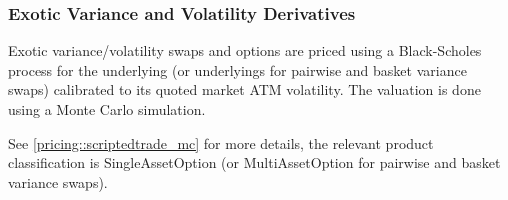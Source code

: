 \subsubsection{Exotic Variance and Volatility Derivatives}
\label{pricing::exotic_variance_swap}

Exotic variance/volatility swaps and options are priced using a Black-Scholes process for the underlying (or underlyings for pairwise
and basket variance swaps) calibrated to its quoted market ATM volatility. The valuation is done using a Monte Carlo simulation.

See \ref{pricing::scriptedtrade_mc} for more details, the relevant product classification is SingleAssetOption (or
MultiAssetOption for pairwise and basket variance swaps).